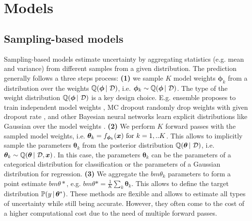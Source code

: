 \section{Models}

\subsection{Sampling-based models}

Sampling-based models estimate uncertainty by aggregating statistics (e.g. mean and variance) from different samples from a given distribution. The prediction generally follows a three steps process:
\textbf{(1)} we sample $K$ model weights $\bm{\phi}_k$ from a distribution over the weights $\operatorname{\mathbb{Q}}(\bm{\phi} \,|\, \operatorname{\mathcal{D}})$, i.e. $\bm{\phi}_k \sim \operatorname{\mathbb{Q}}(\bm{\phi} \,|\, \operatorname{\mathcal{D}})$. The type of the weight distribution $\operatorname{\mathbb{Q}}(\bm{\phi} \,|\, \operatorname{\mathcal{D}})$ is a key design choice. E.g. ensemble proposes to train independent model weights \cite{ensembles}, MC dropout randomly drop weights with given dropout rate \cite{dropout}, and other Bayesian neural networks learn explicit distributions like Gaussian over the model weights \cite{bayesian-networks}. \textbf{(2)} We perform $K$ forward passes with the sampled model weights, i.e. $\bm{\theta}_k = f_{\bm{\phi}_k}(\bm{x}) \text{ for } k=1,..K$. This allows to implicitly sample the parameters $\bm{\theta}_k$ from the posterior distribution $\operatorname{\mathbb{Q}}(\bm{\theta} \,|\, \operatorname{\mathcal{D}})$, i.e. $\bm{\theta}_k \sim \operatorname{\mathbb{Q}}(\bm{\theta} \,|\, \operatorname{\mathcal{D}}, \bm{x})$. In this case, the parameters $\bm{\theta}_k$ can be the parameters of a categorical distribution for classification or the parameters of a Gaussian distribution for regression. \textbf{(3)} We aggregate the $bm{\theta}_k$ parameters to form a point estimate $bm{\theta}*$, e.g. $bm{\theta}*=\frac{1}{K}\sum_k \bm{\theta}_k$. This allows to define the target distribution $\mathbb{P}(y \,|\, \bm{\theta}^*)$. These methods are flexible and allows to estimate all types of uncertainty while still being accurate. However, they often come to the cost of a higher computational cost due to the need of multiple forward passes.

